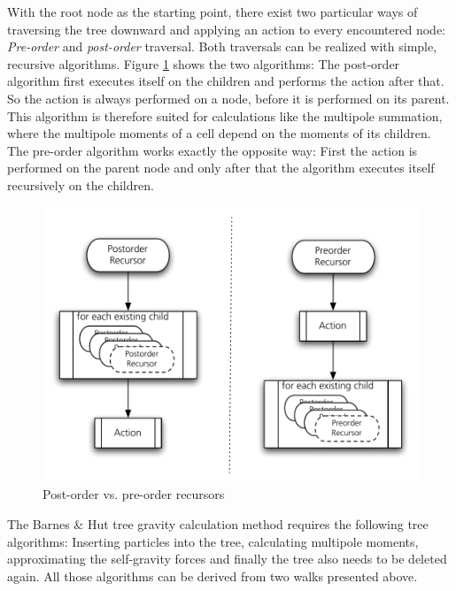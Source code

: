 With the root node as the starting point, there exist two particular ways of traversing the tree downward and applying an action to every encountered node: \emph{Pre-order} and \emph{post-order} traversal. Both traversals can be realized with simple, recursive algorithms. Figure \ref{ch02_fig12} shows the two algorithms: The post-order algorithm first executes itself on the children and performs the action after that. So the action is always performed on a node, before it is performed on its parent. This algorithm is therefore suited for calculations like the multipole summation, where the multipole moments of a cell depend on the moments of its children. The pre-order algorithm works exactly the opposite way: First the action is performed on the parent node and only after that the algorithm executes itself recursively on the children.
\begin{figure}[htbp]
\begin{center}
\includegraphics[scale=0.6]{12orderwalks.pdf}
\caption{Post-order vs. pre-order recursors}
\label{ch02_fig12}
\end{center}
\end{figure}

The Barnes \& Hut tree gravity calculation method requires the following tree algorithms: Inserting particles into the tree, calculating multipole moments, approximating the self-gravity forces and finally the tree also needs to be deleted again. All those algorithms can be derived from two walks presented above.

